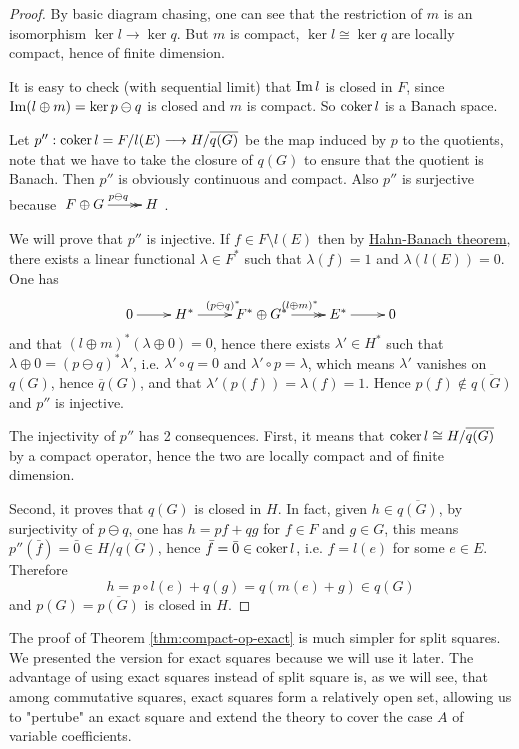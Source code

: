 \begin{proof}
By basic diagram chasing, one can see that the restriction of \(m\) is an isomorphism \(\ker l \longrightarrow \ker q\). But \(m\) is compact, \(\ker l \cong \ker q\) are
locally compact, hence of finite dimension.

It is easy to check (with sequential limit) that \(\mathop{\rm Im}\nolimits l\) is closed in \(F\), since \(\mathop{\rm Im}\nolimits (l\oplus m) =\ker
p\ominus q\) is closed and \(m\) is compact. So \(\mathop{\rm coker}\nolimits l\) is a Banach space.

Let \(p'': \mathop{\rm coker}\nolimits l = F/l(E) \longrightarrow H/\overline{ q(G)}\) be the map induced by
\(p\) to the quotients, note that we have to take the closure of \(q(G)\) to ensure
that the quotient is Banach. Then \(p''\) is obviously continuous and compact. Also \(p''\) is surjective because \(\xymatrix{F\oplus G \ar@{->>}[r]^{p\ominus q} & H}\).

We will prove that \(p''\) is injective. If \(f\in F\setminus l(E)\) then by
\href{https://en.wikipedia.org/wiki/Hahn–Banach\_theorem}{Hahn-Banach theorem}, there exists a linear functional \(\lambda\in F^*\) such that \(\lambda(f)=1\) and \(\lambda (l(E))=0\). One has
\[
 \xymatrix{
0 \ar@{->}[r] & H^* \ar@{->}[r]^{(p\ominus q)^*} & F^*\oplus G^* \ar@{->>}[r]^{(l\oplus m)^*} & E^* \ar@{->}[r] & 0
}
\]
and that \((l\oplus m)^*(\lambda \oplus 0) = 0\), hence there exists \(\lambda'\in H^*\) such that \(\lambda \oplus 0 = (p\ominus q)^* \lambda'\), i.e. \(\lambda'\circ q = 0\) and \(\lambda'\circ p =\lambda\), which means \(\lambda'\) vanishes on \(q(G)\), hence \(\overline
q(G)\), and that \(\lambda'(p(f)) = \lambda (f)=1\). Hence \(p(f)\not\in
\overline{q(G)}\) and \(p''\) is injective.

The injectivity of \(p''\) has 2 consequences. First, it means that \(\mathop{\rm coker}\nolimits l \cong
H/\overline{q(G)}\) by a compact operator, hence the two are locally compact and of
finite dimension.

Second, it proves that \(q(G)\) is closed in \(H\). In fact, given \(h\in
\overline{q(G)}\), by surjectivity of \(p\ominus q\), one has \(h= pf + qg\) for \(f\in F\) and \(g\in G\), this means \(p''(\bar f) = \bar 0 \in H/\overline{q(G)}\), hence \(\bar f =
\bar 0 \in \mathop{\rm coker}\nolimits l\), i.e. \(f = l(e)\) for some \(e\in E\). Therefore
\[
 h = p\circ l (e) + q(g)=  q(m(e) +g)\in q(G)
\]
and \(p(G)=\overline{p(G)}\) is closed in \(H\).
\end{proof}

\begin{remark}
The proof of Theorem \ref{thm:compact-op-exact} is much simpler for split squares. We
presented the version for exact squares because we will use it later. The advantage of
using exact squares instead of split square is, as we will see, that among commutative squares, exact
squares form a relatively open set, allowing us to "pertube" an exact square and extend
the theory to cover the case \(A\) of variable coefficients.
\end{remark}


